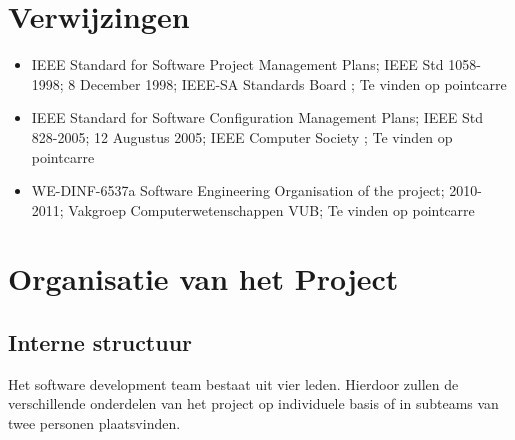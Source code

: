 \documentclass{article}
\begin{document}
\newpage

\section{Verwijzingen}



\begin{itemize}
	\item IEEE Standard for Software Project Management Plans; IEEE Std 1058-1998; 8 December 1998; IEEE-SA Standards Board ; Te vinden op pointcarre \\ 
	\item IEEE Standard for Software Configuration Management Plans; IEEE Std 828-2005; 12 Augustus 2005; IEEE Computer Society ; Te vinden op pointcarre \\
	\item WE-DINF-6537a  Software Engineering Organisation of the project; 2010-2011; Vakgroep Computerwetenschappen VUB; Te vinden op pointcarre \\
\end{itemize}


\newpage
\section{Organisatie van het Project}


\subsection{Interne structuur}

Het software development team bestaat uit vier leden. Hierdoor zullen de verschillende onderdelen van het project op individuele basis of in subteams  van twee personen plaatsvinden.
\end{document}
